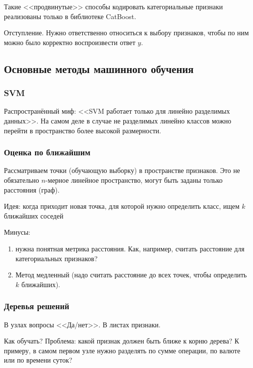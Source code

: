 \documentclass[main.tex]{subfiles}
\begin{document}
Такие <<продвинутые>> способы кодировать категориальные признаки реализованы только в библиотеке CatBoost.

\begin{leftbar}
	Отступление.
	Нужно ответственно относиться к выбору признаков, чтобы по ним можно было корректно воспроизвести ответ $ y $.
\end{leftbar}

\subsection{Основные методы машинного обучения}

\subsubsection{SVM}

Распространённый миф: <<SVM работает только для линейно разделимых данных>>.
На самом деле в случае не разделимых линейно классов можно перейти в пространство более высокой размерности.

\subsubsection{Оценка по ближайшим}

Рассматриваем точки (обучающую выборку) в пространстве признаков.
Это не обязательно $n$-мерное линейное пространство, могут быть заданы только расстояния (граф).

Идея: когда приходит новая точка, для которой нужно определить класс, ищем $k$ ближайших соседей

Минусы:

\begin{enumerate}[noitemsep]
	\item нужна понятная метрика расстояния.
	Как, например, считать расстояние для категориальных признаков?
	\item Метод медленный (надо считать расстояние до всех точек, чтобы определить $k$ ближайших).
\end{enumerate}

\subsubsection{Деревья решений}

В узлах вопросы <<Да/нет>>.
В листах признаки.

Как обучать?
Проблема: какой признак должен быть ближе к корню дерева?
К примеру, в самом первом узле нужно разделять по сумме операции, по валюте или по времени суток?
\end{document}
